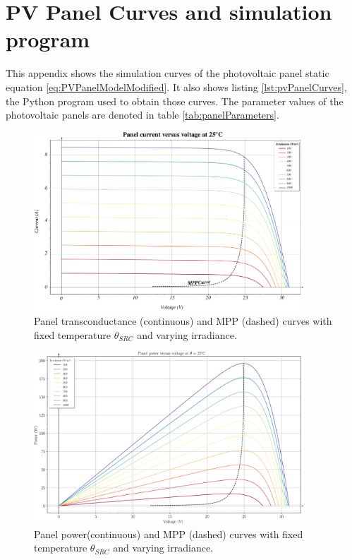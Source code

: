 \chapter{PV Panel Curves and simulation program} \label{ap:pvPanelCurves}

	This appendix shows the simulation curves of the photovoltaic panel static equation \eqref{eq:PVPanelModelModified}. It also shows listing \ref{lst:pvPanelCurves}, the Python program used to obtain those curves. The parameter values of the photovoltaic panels are denoted in table \ref{tab:panelParameters}.

\begin{figure}[h]
	\centering
	\includegraphics[angle = -90, width = 0.9\textwidth]{../images/pvPanelCurves/ivCurve.pdf}
	\caption{Panel transconductance (continuous) and MPP (dashed) curves with fixed temperature $\theta_{SRC}$ and varying irradiance.}
	\label{fig:ivCurve}
\end{figure}

\begin{figure}[h]
	\centering
	\includegraphics[angle = -90, width = 0.9\textwidth]{../images/pvPanelCurves/pvCurve.pdf}
	\caption{Panel power(continuous) and MPP (dashed) curves with fixed temperature $\theta_{SRC}$ and varying irradiance.}
	\label{fig:pvCurve}
\end{figure}

